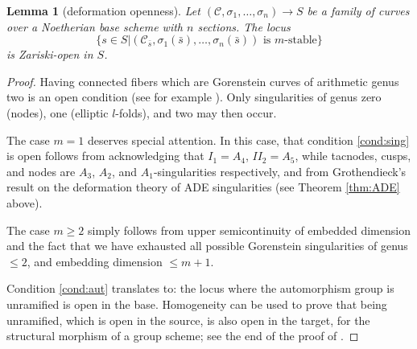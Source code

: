 \documentclass[11pt]{amsart}
\renewcommand{\to}{\rightarrow}
\theoremstyle{plain}
\newtheorem{lem}[thm]{Lemma}
\theoremstyle{definition}
\begin{document}
\begin{lem}[deformation openness]
 Let $(\mathcal C,\sigma_1,\ldots,\sigma_n)\to S$ be a family of curves over a Noetherian base scheme with $n$ sections. The locus \[\{s\in S|(\mathcal C_{\bar s},\sigma_1(\bar s),\ldots,\sigma_n(\bar s)) \text{ is } m\text{-stable}\}\] is Zariski-open in $S$.
\end{lem}
\begin{proof}
 Having connected fibers which are Gorenstein curves of arithmetic genus two is an open condition (see for example \cite[\href{https://stacks.math.columbia.edu/tag/0E1M}{Tag 0E1M}]{stacks-project}). Only singularities of genus zero (nodes), one (elliptic $l$-folds), and two may then occur.
 
 The case $m=1$ deserves special attention. In this case, that condition \eqref{cond:sing} is open follows from acknowledging that $I_1=A_4$, $I\!I_2=A_5$, while tacnodes, cusps, and nodes are $A_3$, $A_2$, and $A_1$-singularities respectively, and from Grothendieck's result on the deformation theory of ADE singularities (see Theorem \ref{thm:ADE} above).
 
 The case $m\geq 2$ simply follows from upper semicontinuity of embedded dimension and the fact that we have exhausted all possible Gorenstein singularities of genus $\leq 2$, and embedding dimension $\leq m+1$.
 
 Condition \eqref{cond:aut} translates to: the locus where the automorphism group is unramified is open in the base. Homogeneity can be used to prove that being unramified, which is open in the source, is also open in the target, for the structural morphism of a group scheme; see the end of the proof of \cite[Lemma 3.10]{SMY1}.
 

\end{proof}
\end{document}
